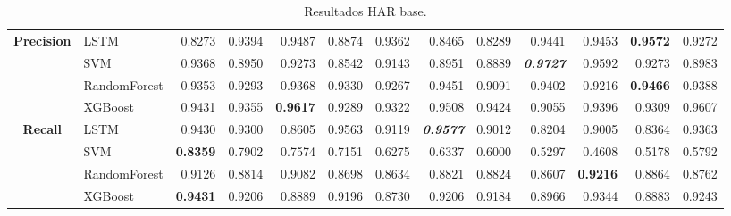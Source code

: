 \begin{table}[H]
\begin{adjustbox}{max width=12cm}
\begin{tabular}{|c|l|r|r|r|r|r|r|r|r|r|r|r|}
			\hline
			\textbf{Precision} &  LSTM &  0.8273 &  0.9394 &  0.9487 &  0.8874 &  0.9362 &  0.8465 &  0.8289 &  0.9441 &  0.9453 & \textbf{  0.9572 } &  0.9272 \\
			&  SVM &  0.9368 &  0.8950 &  0.9273 &  0.8542 &  0.9143 &  0.8951 &  0.8889 & \textit{ \textbf{  0.9727 } } &  0.9592 &  0.9273 &  0.8983 \\
			&  RandomForest &  0.9353 &  0.9293 &  0.9368 &  0.9330 &  0.9267 &  0.9451 &  0.9091 &  0.9402 &  0.9216 & \textbf{  0.9466 } &  0.9388 \\
			&  XGBoost &  0.9431 &  0.9355 & \textbf{  0.9617 } &  0.9289 &  0.9322 &  0.9508 &  0.9424 &  0.9055 &  0.9396 &  0.9309 &  0.9607 \\
			\hline
			\textbf{Recall} &  LSTM &  0.9430 &  0.9300 &  0.8605 &  0.9563 &  0.9119 & \textit{ \textbf{  0.9577 } } &  0.9012 &  0.8204 &  0.9005 &  0.8364 &  0.9363 \\
			&  SVM & \textbf{  0.8359 } &  0.7902 &  0.7574 &  0.7151 &  0.6275 &  0.6337 &  0.6000 &  0.5297 &  0.4608 &  0.5178 &  0.5792 \\
			&  RandomForest &  0.9126 &  0.8814 &  0.9082 &  0.8698 &  0.8634 &  0.8821 &  0.8824 &  0.8607 & \textbf{  0.9216 } &  0.8864 &  0.8762 \\
			&  XGBoost & \textbf{  0.9431 } &  0.9206 &  0.8889 &  0.9196 &  0.8730 &  0.9206 &  0.9184 &  0.8966 &  0.9344 &  0.8883 &  0.9243 \\
			\hline
		\end{tabular}
	\end{adjustbox}
	\caption{Resultados HAR base.}
	\label{tab:HAR_base}
\end{table}
